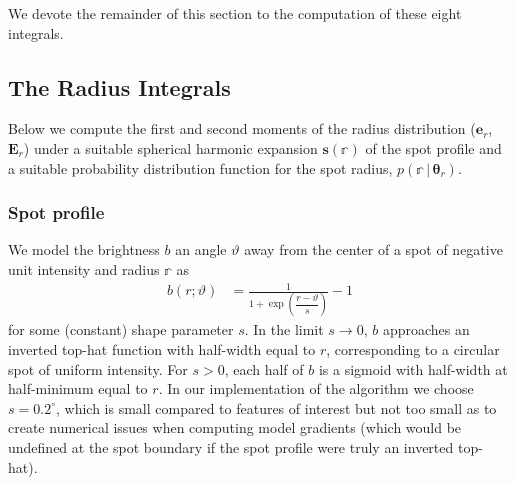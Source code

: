 \documentclass[modern]{aastex62}
\begin{document}
We devote the remainder of this section to the computation of these eight
integrals.

\subsection{The Radius Integrals}
\label{sec:size}
%
Below we compute the first and second moments
of the radius distribution ($\mathbf{e}_r$, $\mathbf{E}_r$) under
a suitable spherical harmonic expansion $\mathbf{s}(\mathbb{r})$ of the spot profile
and a suitable probability distribution function for the spot radius,
$p(\mathbb{r} \, \big| \, \pmb{\theta}_{r})$.

\subsubsection{Spot profile}
%
We model the brightness $b$ an angle $\vartheta$ away from the
center of a spot of negative unit intensity and radius $\mathbb{r}$ as
%
\begin{align}
    \label{eq:brvartheta}
    b(r; \vartheta) & = \frac{1}{1 + \exp\left(\dfrac{r-\vartheta}{s}\right)} - 1
\end{align}
%
for some (constant) shape parameter $s$. In the limit $s \rightarrow 0$, $b$ approaches an
inverted top-hat function with half-width equal to $r$,
corresponding to a circular spot of uniform intensity. For $s > 0$, each half
of $b$ is a sigmoid with half-width at half-minimum equal to $r$.
In our implementation of the algorithm we choose $s = 0.2^\circ$,
which is small compared to features of interest but not too small as to
create numerical issues when computing model gradients (which would be
undefined at the spot boundary if the spot profile were truly an inverted top-hat).
\end{document}
